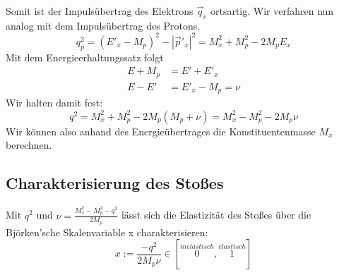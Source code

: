 \documentclass[Ex4_Zusammenfassung.tex]{subfiles}
\begin{document}
Somit ist der Impulsübertrag des Elektrons $\vec q_e$ ortsartig. Wir verfahren nun analog mit dem Impulsübertrag des Protons.
\begin{equation*}
q_p^2 = (E'_x-M_p)^2 - |\vec p'_x|^2 = M_x^2 + M_p^2 - 2 M_p E_x
\end{equation*}
Mit dem Energieerhaltungssatz folgt
\begin{align*}
E + M_p &= E' + E'_x \\
E -E' &= E'_x - M_p = \nu
\end{align*}
Wir halten damit fest:
\begin{equation}
q^2 = M_x^2 + M_p^2 - 2 M_p(M_p + \nu) = M_x^2 - M_p^2 - 2M_p \nu
\end{equation}
Wir können also anhand des Energieübertrages die Konstituentenmasse $M_x$ berechnen.
\subsection{Charakterisierung des Stoßes}
Mit $q^2$ und $\nu= \frac{M_x^2-M_p^2-q^2}{2 M_p}$ lässt sich die Elastizität des Stoßes über die Björken'sche Skalenvariable x charakterisieren:
\begin{equation}
x := \frac{-q^2}{2 M_p \nu} \in [\stackrel{inelastisch}{0}, \stackrel{elastisch}{1}]
\end{equation}
\end{document}
